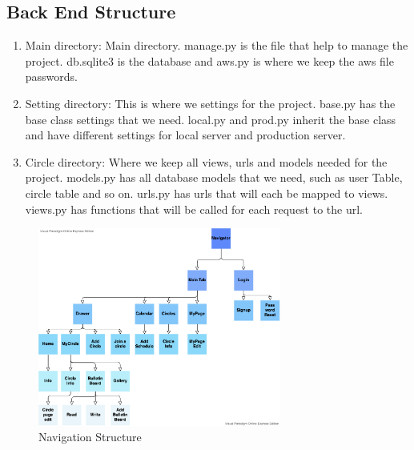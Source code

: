 \documentclass[conference]{IEEEtran}
\begin{document}
\subsection{Back End Structure}
\begin{enumerate}
    \item Main directory: Main directory. manage.py is the file that help to manage the project. db.sqlite3 is the database and aws.py is where we keep the aws file passwords.
    \item Setting directory: This is where we settings for the project. base.py has the base class settings that we need. local.py and prod.py inherit the base class and have different settings for local server and production server.
    \item Circle directory: Where we keep all views, urls and models needed for the project. models.py has all database models that we need, such as user Table, circle table and so on. urls.py has urls that will each be mapped to views. views.py has functions that will be called for each request to the url.
\end{enumerate}
\begin{figure}[h]
    \centering
    \includegraphics[width=8cm]{images/navigation3.png}
    \caption{Navigation Structure}
    \label{fig:my_label}
\end{figure}
\clearpage
\end{document}
